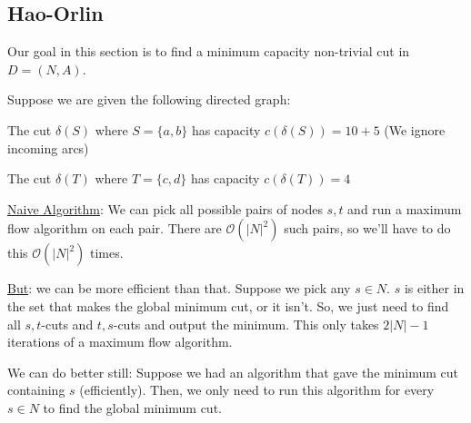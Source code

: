 \subsection{Hao-Orlin}
Our goal in this section is to find a minimum capacity non-trivial cut in $D = (N, A)$.

\begin{example}{}{}
    Suppose we are given the following directed graph:

    \begin{minipage}{\textwidth}
        \centering
    \end{minipage}

    The cut $\delta(S)$ where $S = \{a,b\}$ has capacity $c(\delta(S)) = 10 + 5$ (We ignore incoming arcs)

    The cut $\delta(T)$ where $T = \{c,d\}$ has capacity $c(\delta(T)) = 4$
\end{example}

\underline{Naive Algorithm}: We can pick all possible pairs of nodes $s,t$ and run a maximum flow algorithm on each pair. 
There are $\mathcal{O}(|N|^2)$ such pairs, so we'll have to do this $\mathcal{O}(|N|^2)$ times.

\underline{But}: we can be more efficient than that. Suppose we pick any $s \in N$. 
$s$ is either in the set that makes the global minimum cut, or it isn't. 
So, we just need to find all $s,t$-cuts and $t,s$-cuts and output the minimum.
This only takes $2|N| - 1$ iterations of a maximum flow algorithm.

We can do better still: Suppose we had an algorithm that gave the minimum cut containing $s$ (efficiently).
Then, we only need to run this algorithm for every $s \in N$ to find the global minimum cut.

